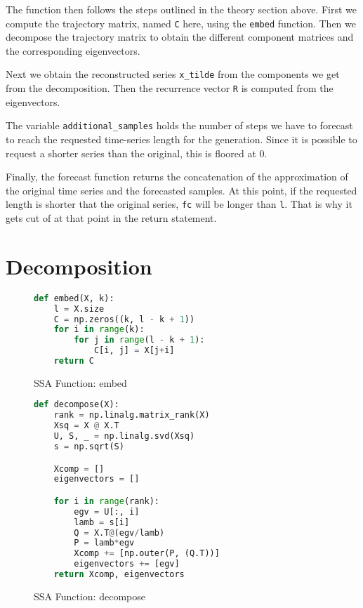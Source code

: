 The function then follows the steps outlined in the theory section above. First we compute the trajectory matrix, named \texttt{C} here, using the \texttt{embed} function. Then we decompose the trajectory matrix to obtain the different component matrices and the corresponding eigenvectors. 

Next we obtain the reconstructed series \texttt{x\_tilde} from the components we get from the decomposition. Then the recurrence vector \texttt{R} is computed from the eigenvectors. 

The variable \texttt{additional\_samples} holds the number of steps we have to forecast to reach the requested time-series length for the generation. Since it is possible to request a shorter series than the original, this is floored at 0. 

Finally, the forecast function returns the concatenation of the approximation of the original time series and the forecasted samples. At this point, if the requested length is shorter that the original series, \texttt{fc} will be longer than \texttt{l}. That is why it gets cut of at that point in the return statement.

\newpage

\section{Decomposition}

\begin{figure}
\begin{singlespace}
\begin{lstlisting}[language=Python]
def embed(X, k):
    l = X.size
    C = np.zeros((k, l - k + 1))
    for i in range(k):
        for j in range(l - k + 1):
            C[i, j] = X[j+i]
    return C
\end{lstlisting}
\end{singlespace}
\caption{SSA Function: embed}    
\label{fig:ssa-embed}
\end{figure}

\begin{figure}
\begin{singlespace}
\begin{lstlisting}[language=Python]
def decompose(X):
    rank = np.linalg.matrix_rank(X)
    Xsq = X @ X.T
    U, S, _ = np.linalg.svd(Xsq)
    s = np.sqrt(S)

    Xcomp = []
    eigenvectors = []

    for i in range(rank):
        egv = U[:, i]
        lamb = s[i]
        Q = X.T@(egv/lamb)
        P = lamb*egv
        Xcomp += [np.outer(P, (Q.T))]
        eigenvectors += [egv]
    return Xcomp, eigenvectors
\end{lstlisting}
\end{singlespace}
\caption{SSA Function: decompose}    
\label{fig:ssa-decompose}
\end{figure}

